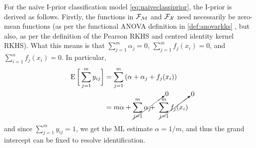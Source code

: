 For the naïve I-prior classification model \cref{eq:naiveclassiprior}, the I-prior is derived as follows.
Firstly, the functions in ${\mathcal F}_{\mathcal M}$ and ${\mathcal F}_{\mathcal X}$ need necessarily be zero-mean functions (as per the functional ANOVA definition in \cref{def:anovarkks} , but also, as per the definition of the Pearson RKHS and centred identity kernel RKHS).
What this means is that $\sum_{j=1}^m \alpha_j = 0$, $\sum_{j=1}^m f_j(x_i) = 0$, and $\sum_{i=1}^n f_j(x_i) = 0$.
In particular,
\begin{align*}
  \E \bigg[ \sum_{j=1}^m y_{ij} \bigg]
  &= \sum_{j=1}^m \left(\alpha + \alpha_j + f_j(x_i) \right) \\
  &= m\alpha + \cancelto{0}{\sum_{j=1}^m \alpha_j \hphantom{aaa}} 
  \hspace{-2em} + \hspace{0.3em} \cancelto{0}{\sum_{j=1}^m f_j(x_i)}
\end{align*}
and since $\sum_{j=1}^m y_{ij} = 1$, we get the ML estimate $\hat\alpha = 1/m$, and thus the grand intercept can be fixed to resolve identification.


